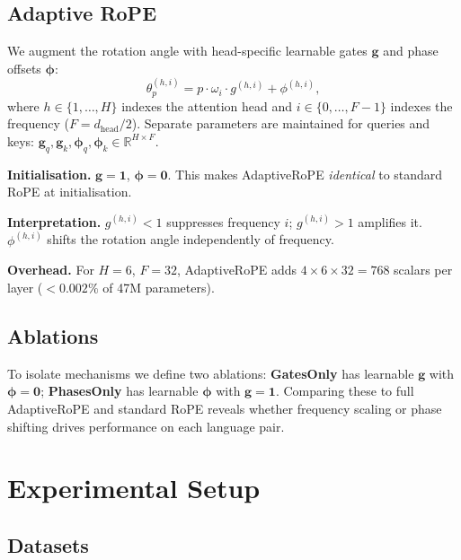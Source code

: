 \documentclass[conference]{IEEEtran}
\begin{document}
\subsection{Adaptive RoPE}

We augment the rotation angle with head-specific learnable gates
$\mathbf{g}$ and phase offsets $\boldsymbol{\phi}$:
\begin{equation}
  \theta_p^{(h,i)} = p \cdot \omega_i \cdot g^{(h,i)} + \phi^{(h,i)},
  \label{eq:adaptive}
\end{equation}
where $h \in \{1,\ldots,H\}$ indexes the attention head and $i \in
\{0,\ldots,F{-}1\}$ indexes the frequency ($F = d_{\text{head}}/2$).
Separate parameters are maintained for queries and keys:
$\mathbf{g}_q, \mathbf{g}_k, \boldsymbol{\phi}_q, \boldsymbol{\phi}_k \in
\mathbb{R}^{H \times F}$.

\textbf{Initialisation.} $\mathbf{g} = \mathbf{1}$, $\boldsymbol{\phi} =
\mathbf{0}$. This makes AdaptiveRoPE \emph{identical} to standard RoPE at
initialisation.

\textbf{Interpretation.} $g^{(h,i)} < 1$ suppresses frequency $i$;
$g^{(h,i)} > 1$ amplifies it. $\phi^{(h,i)}$ shifts the rotation angle
independently of frequency.

\textbf{Overhead.} For $H=6$, $F=32$, AdaptiveRoPE adds $4 \times 6 \times 32 =
768$ scalars per layer ($<0.002\%$ of 47M parameters).

\subsection{Ablations}

To isolate mechanisms we define two ablations:
\textbf{GatesOnly} has learnable $\mathbf{g}$ with $\boldsymbol{\phi}=\mathbf{0}$;
\textbf{PhasesOnly} has learnable $\boldsymbol{\phi}$ with $\mathbf{g}=\mathbf{1}$.
Comparing these to full AdaptiveRoPE and standard RoPE reveals whether frequency
scaling or phase shifting drives performance on each language pair.

\section{Experimental Setup}
\label{sec:setup}

\subsection{Datasets}
\end{document}
